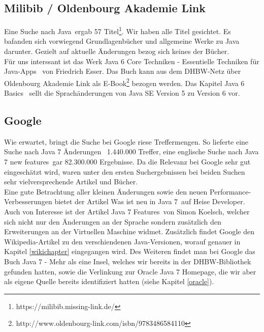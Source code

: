 \subsection{Milibib / Oldenbourg Akademie Link}
Eine Suche nach \glqq Java\grqq ~ergab 57 Titel\footnote{https://milibib.missing-link.de/}. Wir haben alle Titel gesichtet. Es bafanden sich vorwiegend Grundlagenbücher und allgemeine Werke zu Java darunter. Gezielt auf aktuelle Änderungen bezog sich keines der Bücher.\\

Für uns interssant ist das Werk \glqq Java 6 Core Techniken - Essentielle Techniken für Java-Apps\grqq\cite{java6core} ~von Friedrich Esser. Das Buch kann aus dem DHBW-Netz über Oldenbourg Akademie Link als E-Book\footnote{http://www.oldenbourg-link.com/isbn/9783486584110} bezogen werden. Das Kapitel \glqq Java 6 Basics\grqq\cite{java6core} ~sellt die Sprachänderungen von Java SE Version 5 zu Version 6 vor.

\subsection{Google}
Wie erwartet, bringt die Suche bei Google riese Treffermengen. So lieferte eine Suche nach \glqq Java 7 Änderungen\grqq~
1.440.000 Treffer, eine englische Suche nach \glqq Java 7 new features\grqq~gar 82.300.000 Ergebnisse. Da die Relevanz bei
Google sehr gut eingeschätzt wird, waren unter den ersten Suchergebnissen bei beiden Suchen sehr vielversprechende Artikel
und Bücher.\\

Eine gute Betrachtung aller kleinen Änderungen sowie den neuen Performance-Verbesserungen bietet der Artikel
\glqq Was ist neu in Java 7\grqq\cite{heiseWasistNeu}~auf Heise Developer.
Auch von Interesse ist der Artikel \glqq Java 7 Features\grqq\cite{blogJava7Features}~von Simon Koelsch, welcher sich nicht nur
den Änderungen an der Sprache sondern zusätzlich den Erweiterungen an der Virtuellen Maschine widmet.
Zusätzlich findet Google den Wikipedia-Artikel zu den verschiendenen Java-Versionen, worauf genauer in Kapitel \ref{wikichapter} eingegangen wird.
Des Weiteren findet man bei Google das Buch \glqq Java 7 - Mehr als eine Insel\grqq\cite{javainsel2}, welches wir bereits in der
DHBW-Bibliothek gefunden hatten, sowie die Verlinkung zur Oracle Java 7 Homepage, die wir aber als eigene Quelle bereits
identifiziert hatten (siehe Kapitel \ref{oracle}).\\

